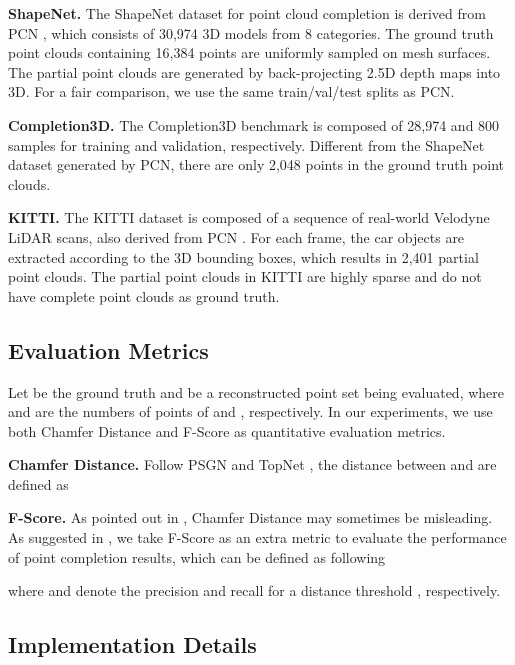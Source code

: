 \documentclass[runningheads]{llncs}
\begin{document}
\noindent \textbf{ShapeNet.}
The ShapeNet dataset \cite{DBLP:conf/cvpr/WuSKYZTX15} for point cloud completion is derived from PCN \cite{DBLP:conf/ThreeDim/YuanKHMH18}, which consists of 30,974 3D models from 8 categories.
The ground truth point clouds containing 16,384 points are uniformly sampled on mesh surfaces.
The partial point clouds are generated by back-projecting 2.5D depth maps into 3D.
For a fair comparison, we use the same train/val/test splits as PCN.

\noindent \textbf{Completion3D.}
The Completion3D benchmark \cite{DBLP:conf/cvpr/TchapmiKR0S19} is composed of 28,974 and 800 samples for training and validation, respectively.
Different from the ShapeNet dataset generated by PCN, there are only 2,048 points in the ground truth point clouds.

\noindent \textbf{KITTI.}
The KITTI dataset \cite{DBLP:journals/ijrr/GeigerLSU13} is composed of a sequence of real-world Velodyne LiDAR scans, also derived from PCN \cite{DBLP:conf/ThreeDim/YuanKHMH18}.
For each frame, the car objects are extracted according to the 3D bounding boxes, which results in 2,401 partial point clouds.
The partial point clouds in KITTI are highly sparse and do not have complete point clouds as ground truth.

\subsection{Evaluation Metrics}

Let  be the ground truth and  be a reconstructed point set being evaluated, where  and  are the numbers of points of  and , respectively.
In our experiments, we use both Chamfer Distance and F-Score as quantitative evaluation metrics.

\noindent \textbf{Chamfer Distance.}
Follow PSGN \cite{DBLP:conf/cvpr/FanSG17} and TopNet \cite{DBLP:conf/cvpr/TchapmiKR0S19}, the distance between  and  are defined as


\noindent \textbf{F-Score.}
As pointed out in \cite{DBLP:conf/cvpr/TatarchenkoRRLK19}, Chamfer Distance may sometimes be misleading.
As suggested in \cite{DBLP:conf/cvpr/TatarchenkoRRLK19}, we take F-Score as an extra metric to evaluate the  performance of point completion results, which can be defined as following

where  and  denote the precision and recall for a distance threshold , respectively.



\subsection{Implementation Details}
\end{document}
